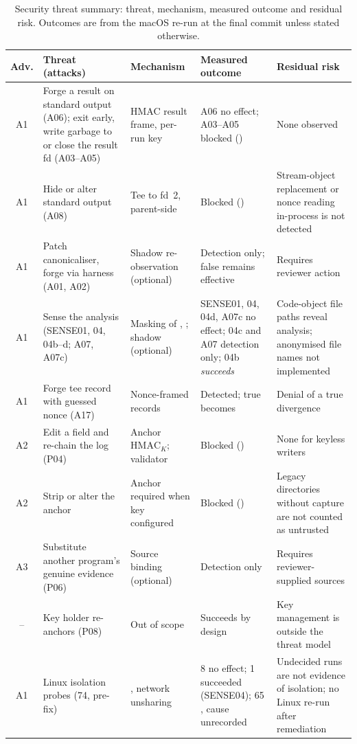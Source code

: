 \begin{table}[!t]
\caption{Security threat summary: threat, mechanism, measured outcome and residual risk. Outcomes are from the macOS re-run at the final commit unless stated otherwise.}
\label{tab:threats}
\centering
\scriptsize
\setlength{\tabcolsep}{3pt}
\begin{tabular}{|c|L{3.3cm}|L{3.4cm}|L{3.6cm}|L{4.6cm}|}
\hline
Adv. & Threat (attacks) & Mechanism & Measured outcome & Residual risk \\
\hline
A1 & Forge a result on standard output (A06); exit early, write garbage to or close the result fd (A03--A05) & HMAC result frame, per-run key & A06 no effect; A03--A05 blocked (\INS{}) & None observed \\
A1 & Hide or alter standard output (A08) & Tee to fd~2, parent-side  & Blocked (\INS{}) & Stream-object replacement or nonce reading in-process is not detected \\
A1 & Patch canonicaliser, forge via harness (A01, A02) & Shadow re-observation (optional) & Detection only; false \NDO{} remains effective & Requires reviewer action \\
A1 & Sense the analysis (SENSE01, 04, 04b--d; A07, A07c) & Masking of , ; shadow (optional) & SENSE01, 04, 04d, A07c no effect; 04c and A07 detection only; 04b \emph{succeeds} & Code-object file paths reveal analysis; anonymised file names not implemented \\
A1 & Forge tee record with guessed nonce (A17) & Nonce-framed records & Detected; true \DIV{} becomes \INS{} & Denial of a true divergence \\
A2 & Edit a field and re-chain the log (P04) & Anchor $\mathrm{HMAC}_K$; validator & Blocked (\INS{}) & None for keyless writers \\
A2 & Strip or alter the anchor & Anchor required when key configured & Blocked (\INS{}) & Legacy directories without capture are not counted as untrusted \\
A3 & Substitute another program's genuine evidence (P06) & Source binding (optional) & Detection only & Requires reviewer-supplied sources \\
-- & Key holder re-anchors (P08) & Out of scope & Succeeds by design & Key management is outside the threat model \\
A1 & Linux isolation probes (74, pre-fix) & , network unsharing & 8 no effect; 1 succeeded (SENSE04); 65 \INS{}, cause unrecorded & Undecided runs are not evidence of isolation; no Linux re-run after remediation \\
\hline
\end{tabular}
\end{table}
